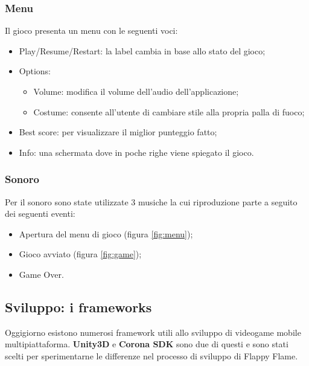 		\subsubsection{Menu}
			Il gioco presenta un menu con le seguenti voci:
			\begin{itemize}
				\item Play/Resume/Restart: la label cambia in base allo stato del gioco;
				\item Options:
				\begin{itemize}
					\item Volume: modifica il volume dell'audio dell'applicazione;
					\item Costume: consente all'utente di cambiare stile alla propria palla di fuoco;
				\end{itemize}
				\item Best score: per visualizzare il miglior punteggio fatto;
				\item Info: una schermata dove in poche righe viene spiegato il gioco.
			\end{itemize}
		
		\subsubsection{Sonoro}
			Per il sonoro sono state utilizzate 3 musiche la cui riproduzione parte a seguito dei seguenti eventi:
			\begin{itemize}
				\item Apertura del menu di gioco (figura \ref{fig:menu});
				\item Gioco avviato (figura \ref{fig:game});
				\item Game Over.
			\end{itemize}
	

	
	\subsection{Sviluppo: i frameworks}
		Oggigiorno esistono numerosi framework utili allo sviluppo di videogame mobile multipiattaforma. \textbf{Unity3D} e \textbf{Corona SDK} sono due di questi e sono stati scelti per sperimentarne le differenze nel processo di sviluppo di Flappy Flame.
		

